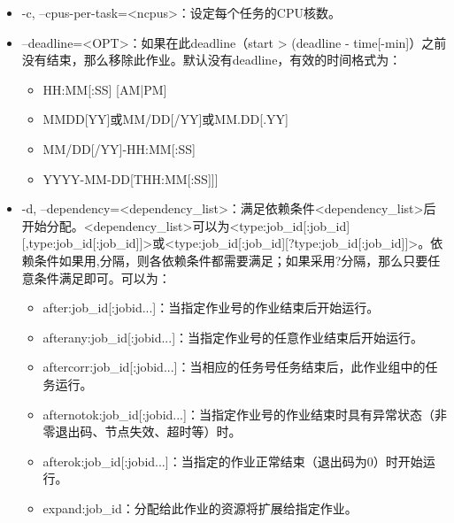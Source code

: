 \begin{itemize}



    \item -c, --cpus-per-task=<ncpus>：设定每个任务的CPU核数。
    \item  --deadline=<OPT>：如果在此deadline（start > (deadline - time[-min]）之前没有结束，那么移除此作业。默认没有deadline，有效的时间格式为：
\begin{itemize}
	\item HH:MM[:SS] [AM|PM]
    \item MMDD[YY]或MM/DD[/YY]或MM.DD[.YY]
    \item MM/DD[/YY]-HH:MM[:SS]
    \item YYYY-MM-DD[THH:MM[:SS]]]
\end{itemize}
    \item -d, --dependency=<dependency\_list>：满足依赖条件<dependency\_list>后开始分配。<dependency\_list>可以为<type:job\_id[:job\_id][,type:job\_id[:job\_id]]>或<type:job\_id[:job\_id][?type:job\_id[:job\_id]]>。依赖条件如果用,分隔，则各依赖条件都需要满足；如果采用?分隔，那么只要任意条件满足即可。可以为：
\begin{itemize}
	\item after:job\_id[:jobid...]：当指定作业号的作业结束后开始运行。
    \item afterany:job\_id[:jobid...]：当指定作业号的任意作业结束后开始运行。
    \item aftercorr:job\_id[:jobid...]：当相应的任务号任务结束后，此作业组中的任务运行。
    \item afternotok:job\_id[:jobid...]：当指定作业号的作业结束时具有异常状态（非零退出码、节点失效、超时等）时。
    \item afterok:job\_id[:jobid...]：当指定的作业正常结束（退出码为0）时开始运行。
    \item expand:job\_id：分配给此作业的资源将扩展给指定作业。

\end{itemize}
\end{itemize}
